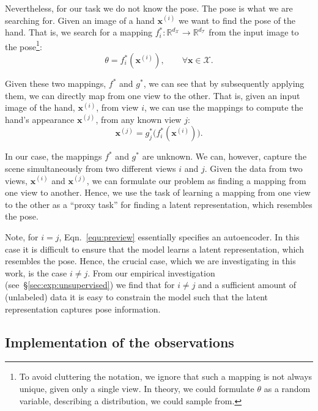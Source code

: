 \documentclass[10pt,twocolumn,letterpaper]{article}
\begin{document}
Nevertheless, for our task we do not know the pose. 
The pose is what we are searching for.
Given an image of a hand $\mathbf{x}^{(i)}$ we want to find 
the pose of the hand.
That is, we search for a mapping 
$f^{\ast}_{i} \colon \mathbb{R}^{d_{\mathcal{X}}} \rightarrow \mathbb{R}^{d_{\mathcal{T}}}$ 
from the input image to the pose\footnote{To avoid cluttering the notation, we ignore 
that such a mapping is not always unique, given only a single view. 
In theory, we could formulate $\theta$ as a random variable, 
describing a distribution, we could sample from.}:
\begin{equation}
 \theta = f^{\ast}_{i} ( \mathbf{x}^{(i)} ), \qquad \forall \mathbf{x} \in \mathcal{X}.
 \label{equ:appearancetopose}
\end{equation}

Given these two mappings, $f^{\ast}$ and $g^{\ast}$, 
we can see that by subsequently applying them, 
we can directly map from one view to the other.
That is, given an input image of the hand, $\mathbf{x}^{(i)}$,
from view $i$, we can use the mappings to compute 
the hand's appearance $\mathbf{x}^{(j)}$, from any known view $j$:
\begin{equation}
 \mathbf{x}^{(j)} = g^{\ast}_{j}\big( f^{\ast}_{i} ( \mathbf{x}^{(i)} ) \big).
 \label{equ:preview}
\end{equation}

In our case, the mappings $f^{\ast}$ and $g^{\ast}$ are unknown.
We can, however, capture the scene simultaneously from two different views 
$i$ and $j$.
Given the data from two views, $\mathbf{x}^{(i)}$ and $\mathbf{x}^{(j)}$, 
we can formulate our problem as finding a mapping 
from one view to another.
Hence, we use the task of learning a mapping from one view to the other as a ``proxy task''
for finding a latent representation, which resembles the pose.

Note, for $i = j$, Eqn.~\eqref{equ:preview} 
essentially specifies an autoencoder.
In this case it is difficult to ensure that the model 
learns a latent representation, which resembles the pose.
Hence, the crucial case, which we are investigating in this work, 
is the case $i \neq j$.
From our empirical investigation (see~\S\ref{sec:exp:unsupervised}) we find that 
for $i \neq j$ and a sufficient amount of (unlabeled) data
it is easy to constrain the model such that the latent representation
captures pose information.

\subsection{Implementation of the observations}\label{sec:met:unlabeled}
\end{document}
